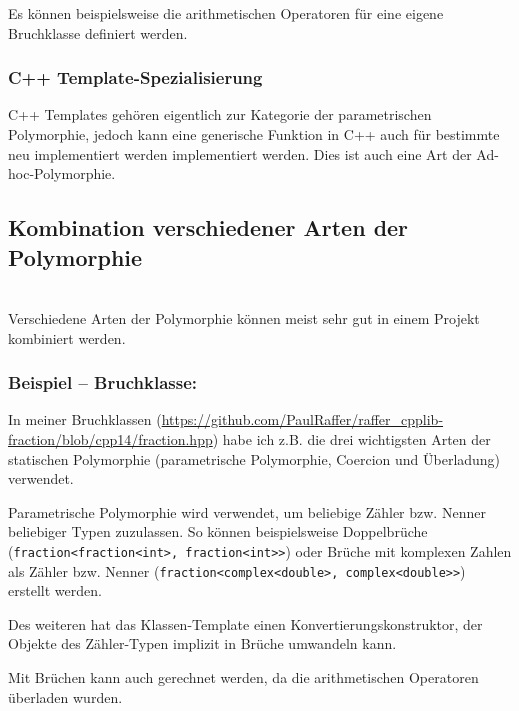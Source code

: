 				Es können beispielsweise die arithmetischen Operatoren für eine eigene Bruchklasse definiert werden.
				
		\subsubsection{C++ Template-Spezialisierung}
			C++ Templates gehören eigentlich zur Kategorie der parametrischen Polymorphie, jedoch kann eine generische Funktion in C++ auch für
			bestimmte neu implementiert werden implementiert werden. Dies ist auch eine Art der Ad-hoc-Polymorphie.
			
	\subsection{Kombination verschiedener Arten der Polymorphie}\mbox{}\\
		Verschiedene Arten der Polymorphie können meist sehr gut in einem Projekt kombiniert werden.
		\subsubsection*{Beispiel -- Bruchklasse:}
			In meiner Bruchklassen (\url{https://github.com/PaulRaffer/raffer_cpplib-fraction/blob/cpp14/fraction.hpp}) habe ich z.B. die
			drei wichtigsten Arten der statischen Polymorphie (parametrische Polymorphie, Coercion und Überladung) verwendet.
			
			Parametrische Polymorphie wird verwendet, um beliebige Zähler bzw. Nenner beliebiger Typen zuzulassen. So können beispielsweise
			Doppelbrüche (\lstinline|fraction<fraction<int>, fraction<int>>|) oder Brüche mit komplexen Zahlen als Zähler bzw. Nenner (\lstinline|fraction<complex<double>, complex<double>>|) erstellt
			werden.
			
			Des weiteren hat das Klassen-Template einen Konvertierungskonstruktor, der Objekte des Zähler-Typen implizit in Brüche
			umwandeln kann.
			
			Mit Brüchen kann auch gerechnet werden, da die arithmetischen Operatoren überladen wurden.